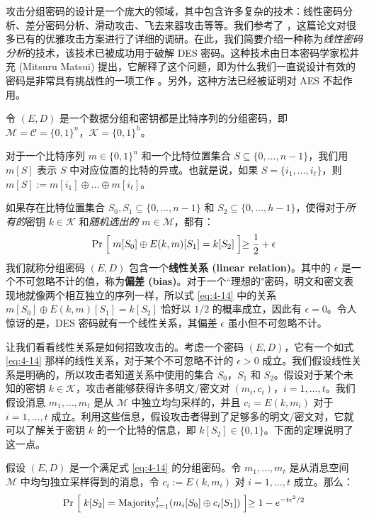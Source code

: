 攻击分组密码的设计是一个庞大的领域，其中包含许多复杂的技术：线性密码分析、差分密码分析、滑动攻击、飞去来器攻击等等。我们参考了 \cite{standaert2003cryptanalysis}，这篇论文对很多已有的优雅攻击方案进行了详细的调研。在此，我们简要介绍一种称为\emph{线性密码分析}的技术，该技术已被成功用于破解 DES 密码。这种技术由日本密码学家松井充 (Mitsuru Matsui) 提出，它解释了这个问题，即为什么我们一直说设计有效的密码是非常具有挑战性的一项工作 \cite{matsui1993linear,matsui1994first}。另外，这种方法已经被证明对 AES 不起作用。

\begin{snote}[线性密码分析。]
令 $(E,D)$ 是一个数据分组和密钥都是比特序列的分组密码，即 $\mathcal{M}=\mathcal{C}=\{0,1\}^n$，$\mathcal{K}=\{0,1\}^h$。

对于一个比特序列 $m\in\{0,1\}^n$ 和一个比特位置集合 $S\subseteq\{0,\dots,n-1\}$，我们用 $m[S]$ 表示 $S$ 中对应位置的比特的异或。也就是说，如果 $S=\{i_1,\dots,i_\ell\}$，则 $m[S]:=m[i_1]\oplus\dots\oplus m[i_\ell]$。

如果存在比特位置集合 $S_0,S_1\subseteq\{0,\dots,n-1\}$ 和 $S_2\subseteq\{0,\dots,h-1\}$，使得对于\emph{所有的}密钥 $k\in\mathcal{K}$ 和\emph{随机选出的} $m\in\mathcal{M}$，都有：
\begin{equation}\label{eq:4-14}
\Pr
\Bigm[
m[S_0]\oplus E(k,m)[S_1]=k[S_2]
\Bigm]
\geq
\frac{1}{2}+\epsilon
\end{equation}
我们就称分组密码 $(E,D)$ 包含一个\textbf{线性关系 (linear relation)}。其中的 $\epsilon$ 是一个不可忽略不计的值，称为\textbf{偏差 (bias)}。对于一个``理想的"密码，明文和密文表现地就像两个相互独立的序列一样，所以式 \ref{eq:4-14} 中的关系 $m[S_0]\oplus E(k,m)[S_1]=k[S_2]$ 恰好以 $1/2$ 的概率成立，因此有 $\epsilon=0$。令人惊讶的是，DES 密码就有一个线性关系，其偏差 $\epsilon$ 虽小但不可忽略不计。

让我们看看线性关系是如何招致攻击的。考虑一个密码 $(E,D)$，它有一个如式 \ref{eq:4-14} 那样的线性关系，对于某个不可忽略不计的 $\epsilon>0$ 成立。我们假设线性关系是明确的，所以攻击者知道关系中使用的集合 $S_0$，$S_1$ 和 $S_2$。假设对于某个未知的密钥 $k\in\mathcal{K}$，攻击者能够获得许多明文/密文对 $(m_i,c_i)$，$i=1,\dots,t$。我们假设消息 $m_1,\dots,m_t$ 是从 $\mathcal{M}$ 中独立均匀采样的，并且 $c_i=E(k,m_i)$ 对于 $i=1,\dots,t$ 成立。利用这些信息，假设攻击者得到了足够多的明文/密文对，它就可以了解关于密钥 $k$ 的一个比特的信息，即 $k[S_2]\in\{0,1\}$。下面的定理说明了这一点。
\end{snote}

\begin{lemma}\label{lemma:4-3}
假设 $(E, D)$ 是一个满足式 \ref{eq:4-14} 的分组密码。令 $m_1,\dots,m_t$ 是从消息空间 $\mathcal{M}$ 中均匀独立采样得到的消息，令 $c_i:=E(k,m_i)$ 对 $i=1,\dots,t$ 成立。那么：
\begin{equation}\label{eq:4-15}
\Pr
\Bigm[
k[S_2]={\rm Majority}^t_{i=1}(m_i[S_0]\oplus c_i[S_1])
\Bigm]
\geq1-e^{-{t\epsilon^2}/{2}}
\end{equation}
\end{lemma}

